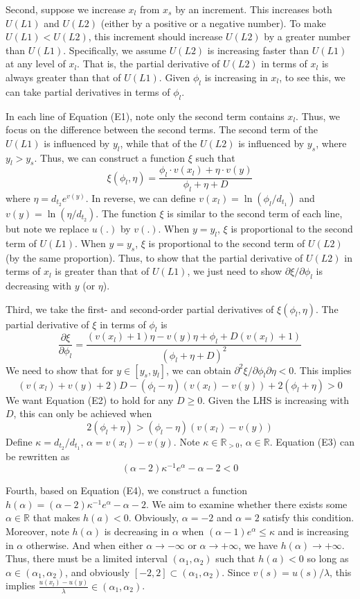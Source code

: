 Second, suppose we increase \(x_l\) from \(x_s\) by an increment. This
increases both \(U(L1)\) and \(U(L2)\) (either by a positive or a
negative number). To make \(U(L1)<U(L2)\), this increment should
increase \(U(L2)\) by a greater number than \(U(L1)\). Specifically, we
assume \(U(L2)\) is increasing faster than \(U(L1)\) at any level of
\(x_l\). That is, the partial derivative of \(U(L2)\) in terms of
\(x_l\) is always greater than that of \(U(L1)\). Given \(\phi_l\) is
increasing in \(x_l\), to see this, we can take partial derivatives in
terms of \(\phi_l\).

In each line of Equation (E1), note only the second term contains
\(x_l\). Thus, we focus on the difference between the second terms. The
second term of the \(U(L1)\) is influenced by \(y_l\), while that of the
\(U(L2)\) is influenced by \(y_s\), where \(y_l>y_s\). Thus, we can
construct a function \(\xi\) such that\[
\xi(\phi_l,\eta) = \frac{\phi_l \cdot v(x_l)+\eta\cdot v(y)}{\phi_l+\eta+D}
\]where \(\eta=d_{t_2}e^{v(y)}\). In reverse, we can define
\(v(x_l)=\ln(\phi_l/d_{t_1})\) and \(v(y)=\ln(\eta/d_{t_2})\). The
function \(\xi\) is similar to the second term of each line, but note we
replace \(u(.)\) by \(v(.)\). When \(y=y_l\), \(\xi\) is proportional to
the second term of \(U(L1)\). When \(y=y_s\), \(\xi\) is proportional to
the second term of \(U(L2)\) (by the same proportion). Thus, to show
that the partial derivative of \(U(L2)\) in terms of \(x_l\) is greater
than that of \(U(L1)\), we just need to show
\(\partial \xi/\partial \phi_l\) is decreasing with \(y\) (or \(\eta\)).

Third, we take the first- and second-order partial derivatives of
\(\xi(\phi_l,\eta)\). The partial derivative of \(\xi\) in terms of
\(\phi_l\) is\[
\frac{\partial \xi}{\partial \phi_l}=\frac{(v(x_l)+1)\eta-v(y)\eta+\phi_l+D(v(x_l)+1)}{(\phi_l+\eta+D)^2}
\]We need to show that for \(y\in[y_s,y_l]\), we can obtain
\(\partial^2 \xi/\partial \phi_l\partial \eta<0\). This
implies\[\tag{E2}
(v(x_l)+v(y)+2)D-(\phi_l-\eta)(v(x_l)-v(y))+2(\phi_l+\eta)>0
\]We want Equation (E2) to hold for any \(D\geq 0\). Given the LHS is
increasing with \(D\), this can only be achieved when\[\tag{E3}
2(\phi_l+\eta)>(\phi_l-\eta)(v(x_l)-v(y))
\]Define \(\kappa=d_{t_2}/d_{t_1}\), \(\alpha=v(x_l)-v(y)\). Note
\(\kappa\in \mathbb{R}_{>0}\), \(\alpha\in\mathbb{R}\). Equation (E3)
can be rewritten as\[\tag{E4}
(\alpha-2)\kappa^{-1} e^{\alpha}-\alpha-2<0
\]

Fourth, based on Equation (E4), we construct a function
\(h(\alpha)=(\alpha-2)\kappa^{-1} e^\alpha-\alpha-2\). We aim to examine
whether there exists some \(\alpha\in\mathbb{R}\) that makes \(h(a)<0\).
Obviously, \(\alpha=-2\) and \(\alpha=2\) satisfy this condition.
Moreover, note \(h(\alpha)\) is decreasing in \(\alpha\) when
\((\alpha-1)e^{\alpha}\leq \kappa\) and is increasing in \(\alpha\)
otherwise. And when either \(\alpha\rightarrow -\infty\) or
\(\alpha \rightarrow +\infty\), we have
\(h(\alpha)\rightarrow +\infty\). Thus, there must be a limited interval
\((\alpha_1,\alpha_2)\) such that \(h(a)<0\) so long as
\(\alpha\in(\alpha_1,\alpha_2)\), and obviously
\([-2,2]\subset(\alpha_1,\alpha_2)\). Since \(v(s)=u(s)/\lambda\), this
implies \(\frac{u(x_l)-u(y)}{\lambda}\in(\alpha_1,\alpha_2)\).


